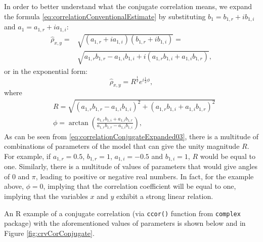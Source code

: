 \documentclass[
]{book}
\begin{document}
In order to better understand what the conjugate correlation means, we expand the formula \eqref{eq:correlationConventionalEstimate} by substituting \(b_1 = b_{1,r} + i b_{1,i}\) and \(a_1 = a_{1,r} + i a_{1,i}\):
\begin{equation}
    \begin{aligned}
        \hat{\rho}_{x,y} = & \sqrt{(a_{1,r} + i a_{1,i}) (b_{1,r}+ib_{1,i})} = \\
        & \sqrt{a_{1,r} b_{1,r} - a_{1,i} b_{1,i} + i(a_{1,r} b_{1,i} + a_{1,i} b_{1,r})},
    \end{aligned}
    \label{eq:correlationConjugateExpanded01}
\end{equation}
or in the exponential form:
\begin{equation}
    \hat{\rho}_{x,y} = R^{\frac{1}{2}} e^{i \frac{1}{2} \phi} ,
    \label{eq:correlationConjugateExpanded02}
\end{equation}
where
\begin{equation}
    \begin{aligned}
        & R = \sqrt{(a_{1,r} b_{1,r} - a_{1,i} b_{1,i})^2 + (a_{1,r} b_{1,i} + a_{1,i} b_{1,r})^2} \\
        & \phi=\arctan\left(\frac{a_{1,r} b_{1,i} + a_{1,i} b_{1,r}}{a_{1,r} b_{1,r} - a_{1,i} b_{1,i}}\right),
    \end{aligned}
    \label{eq:correlationConjugateExpanded03}
\end{equation}
As can be seen from \eqref{eq:correlationConjugateExpanded03}, there is a multitude of combinations of parameters of the model that can give the unity magnitude \(R\). For example, if \(a_{1,r} = 0.5\), \(b_{1,r} = 1\), \(a_{1,i} = -0.5\) and \(b_{1,i} = 1\), \(R\) would be equal to one. Similarly, there is a multitude of values of parameters that would give angles of \(0\) and \(\pi\), leading to positive or negative real numbers. In fact, for the example above, \(\phi=0\), implying that the correlation coefficient will be equal to one, implying that the variables \(x\) and \(y\) exhibit a strong linear relation.

An R example of a conjugate correlation (via \texttt{ccor()} function from \texttt{complex} package) with the aforementioned values of parameters is shown below and in Figure \ref{fig:crvCorConjugate}.
\end{document}
